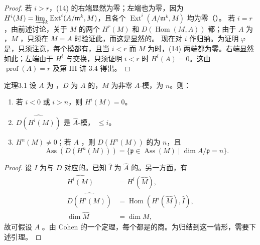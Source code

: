 \begin{proof}
若 $i>r$，(14) 的右端显然为零；左端也为零，因为 $H^i(M)=\varinjlim_k\operatorname{Ext}^i(A/\mathfrak m^k,M)$，且各个 $\operatorname{Ext}^i(A/\mathfrak m^k,M)$ 均为零（）。
若 $i=r$，由前述讨论，关于 $M$ 的两个 $H^r(M)$ 和 $D(\operatorname{Hom}(M,A))$ 都；由于 $A$ 为 ，$M$ ，只须在 $M=A$ 时验证此，而这是显然的。
现在对 $i$ 作归纳。为证明 $\varphi$ 是，只须注意，每个模都有，且当 $i<r$ 而 $M$ 为时，(14) 两端都为零。右端显然如此；左端由于 $H^i$ 与交换，只须证明 $i<r$ 时 $H^i(A)=0$。这由 $\operatorname{prof}(A)=r$ 及第 III 讲 3.4 得出。
\end{proof}
\begin{SGAresult}{定理}{3.1}
设 $A$ 为 ，$D$ 为 $A$ 的，$M$ 为非零 $A$-模，为 $n$。则：
\begin{enumerate}
\item[(i)] 若 $i<0$ 或 $i>n$，则 $H^i(M)=0$。
\item[(ii)] $\widehat{D(H^i(M))}$ 是 $\widehat A$-模， $\le i$。
\item[(iii)] $H^n(M)\ne0$；若 $A$ ，则 $D(H^n(M))$ 的为 $n$，且
\[\operatorname{Ass}(D(H^n(M)))=\{\mathfrak p\in\operatorname{Ass}(M)\mid\dim A/\mathfrak p=n\}.\]
\end{enumerate}
\end{SGAresult}
\begin{proof}
设 $I$ 为与 $D$ 对应的。已知 $\widehat I$ 为 $\widehat A$ 的。另一方面，有
\[\begin{aligned}
\widehat{H^i(M)}&=H^i(\widehat M),\\
\widehat{D(H^i(M))}&=\operatorname{Hom}(H^i(\widehat M),\widehat I),\\
\dim\widehat M&=\dim M,
\end{aligned}\]
故可假设 $A$ 。由 Cohen 的一个定理，每个都是的商。为归结到这一情形，需要下述引理。
\end{proof}
